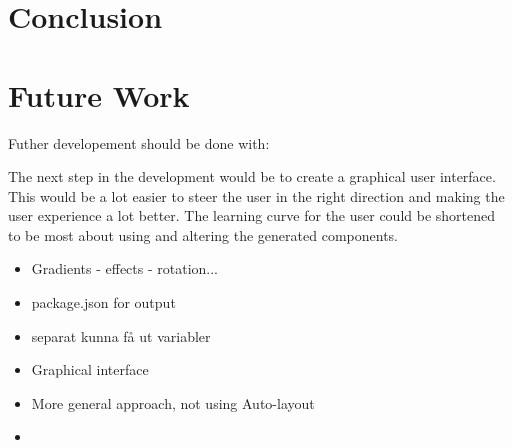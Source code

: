 \section{Conclusion}
\label{sub:conclusion}

\section{Future Work}%
\label{sub:Future Work}
Futher developement should be done with:

The next step in the development would be to create a graphical user interface. This would be a lot easier to steer the user in the right direction and making the user experience a lot better. The learning curve for the user could be shortened to be most about using and altering the generated components. 

\begin{itemize}
   \item Gradients - effects - rotation...
   \item package.json for output
   \item separat kunna få ut variabler 
   \item Graphical interface 
   \item More general approach, not using Auto-layout
   \item 
\end{itemize}


